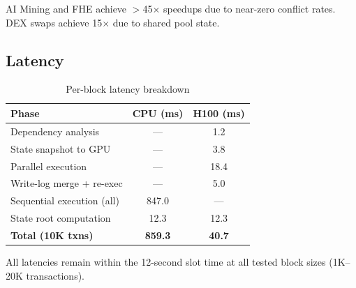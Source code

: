 AI Mining and FHE achieve $>$45$\times$ speedups due to near-zero conflict rates.
DEX swaps achieve 15$\times$ due to shared pool state.

\subsection{Latency}

\begin{table}[h]
\centering
\begin{tabular}{lcc}
\toprule
\textbf{Phase} & \textbf{CPU (ms)} & \textbf{\cevm{} H100 (ms)} \\
\midrule
Dependency analysis & --- & 1.2 \\
State snapshot to GPU & --- & 3.8 \\
Parallel execution & --- & 18.4 \\
Write-log merge + re-exec & --- & 5.0 \\
Sequential execution (all) & 847.0 & --- \\
State root computation & 12.3 & 12.3 \\
\midrule
\textbf{Total (10K txns)} & \textbf{859.3} & \textbf{40.7} \\
\bottomrule
\end{tabular}
\caption{Per-block latency breakdown}
\label{tab:latency}
\end{table}

All \cevm{} latencies remain within the 12-second \Lux{} slot time at all tested block sizes (1K--20K transactions).

